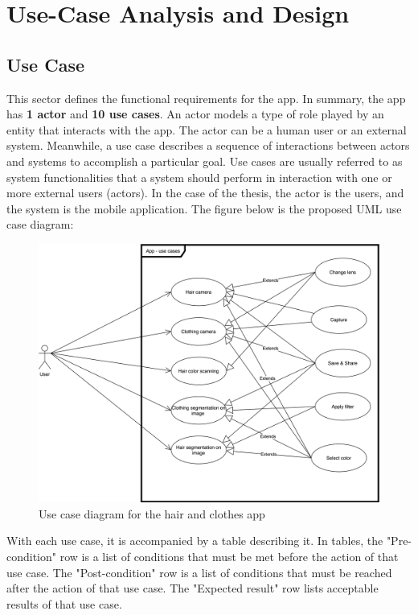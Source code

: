 \section{Use-Case Analysis and Design} \label{sec:usecase}

\subsection{Use Case}
This sector defines the functional requirements for the app. In summary, the app has \textbf{1 actor} and \textbf{10 use cases}. An actor models a type of role played by an entity that interacts with the app. The actor can be a human user or an external system. Meanwhile, a use case describes a sequence of interactions between actors and systems to accomplish a particular goal. Use cases are usually referred to as system functionalities that a system should perform in interaction with one or more external users (actors). In the case of the thesis, the actor is the users, and the system is the mobile application. The figure below is the proposed UML \cite{uml} use case diagram: \par

\begin{figure} [H]
    \centering
    \captionsetup{justification=centering}
    \includegraphics[width=1.0\textwidth]{chapter3/image/use-case.png}
    \caption{Use case diagram for the hair and clothes app}
    \label{fig:schnet_LiNet}
\end{figure}

With each use case, it is accompanied by a table describing it. In tables, the "Pre-condition" row is a list of conditions that must be met before the action of that use case. The "Post-condition" row is a list of conditions that must be reached after the action of that use case. The "Expected result" row lists acceptable results of that use case.

